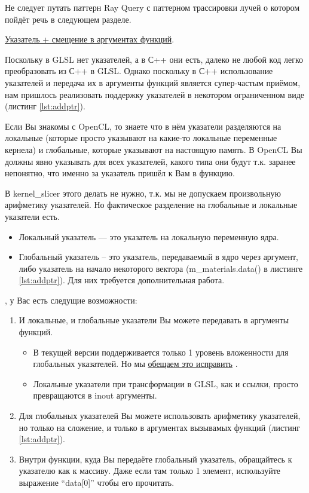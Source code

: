 \documentclass[11pt,fleqn,english,russian]{report} %
\begin{document}
\begin{remark}
Не следует путать паттерн Ray Query с паттерном трассировки лучей о котором пойдёт речь в следующем разделе. 
\end{remark}

\noindent\underline{Указатель + смещение в аргументах функций}.

Поскольку в GLSL нет указателей, а в С++ они есть, далеко не любой код легко преобразовать из С++ в GLSL. Однако поскольку в С++ использование указателей и передача их в аргументы функций является супер-частым приёмом, нам пришлось реализовать поддержку указателей в некотором ограниченном виде (листинг \ref{lst:addptr}). 

Если Вы знакомы с OpenCL, то знаете что в нём указатели разделяются на локальные (которые просто указывают на какие-то локальные переменные кернела) и глобальные, которые указывают на настоящую память. В OpenCL Вы должны явно указывать для всех указателей, какого типа они будут т.к. заранее непонятно, что именно за указатель пришёл к Вам в функцию. 

В kernel\_slicer этого делать не нужно, т.к. мы не допускаем произвольную арифметику указателей. Но фактическое разделение на глобальные и локальные указатели есть.

\begin{itemize}
\item Локальный указатель  --- это указатель на локальную переменную ядра.  
\item Глобальный указатель -- это указатель, передаваемый в ядро через аргумент, либо указатель на начало некоторого вектора (m\_materials.data() в листинге \ref{lst:addptr}). Для них требуется дополнительная работа.
\end{itemize}

, у Вас есть следущие возможности:

\begin{enumerate}
\item И локальные, и глобальные указатели Вы можете передавать в аргументы функций. 
\begin{itemize}
\item В текущей версии поддерживается только 1 уровень вложенности для глобальных указателей. Но мы \href{https://github.com/Ray-Tracing-Systems/kernel_slicer/issues/16}{обещаем это исправить} \cite{issue16}.
\item Локальные указатели при трансформации в GLSL, как и ссылки, просто превращаются в inout аргументы.
\end{itemize}	
\item Для глобальных указателей Вы можете использовать арифметику указателей, но только на сложение, и только в аргументах вызывамых функций (листинг \ref{lst:addptr}).
\item Внутри функции, куда Вы передаёте глобальный указатель, обращайтесь к указателю как к массиву. Даже если там только 1 элемент, используйте выражение ``data[0]'' чтобы его прочитать. 
\end{enumerate}
\end{document}
